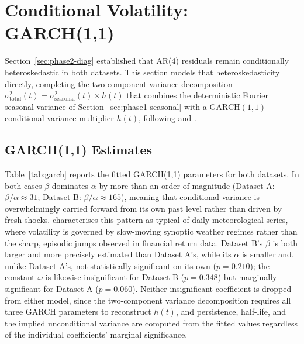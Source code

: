 \section{Conditional Volatility: GARCH(1,1)}
\label{sec:phase3}

Section~\ref{sec:phase2-diag} established that AR(4) residuals remain conditionally heteroskedastic in both datasets. This section models that heteroskedasticity directly, completing the two-component variance decomposition $\sigma^2_{\text{total}}(t) = \sigma^2_{\text{seasonal}}(t) \times h(t)$ that combines the deterministic Fourier seasonal variance of Section~\ref{sec:phase1-seasonal} with a GARCH$(1,1)$ conditional-variance multiplier $h(t)$, following \citet{Tol1997} and \citet{Bollerslev1986}.

\subsection{GARCH(1,1) Estimates}
\label{sec:phase3-estimates}

Table~\ref{tab:garch} reports the fitted GARCH(1,1) parameters for both datasets. In both cases $\beta$ dominates $\alpha$ by more than an order of magnitude (Dataset A: $\beta/\alpha \approx 31$; Dataset B: $\beta/\alpha \approx 165$), meaning that conditional variance is overwhelmingly carried forward from its own past level rather than driven by fresh shocks. \citet{Tol1997} characterises this pattern as typical of daily meteorological series, where volatility is governed by slow-moving synoptic weather regimes rather than the sharp, episodic jumps observed in financial return data. Dataset B's $\beta$ is both larger and more precisely estimated than Dataset A's, while its $\alpha$ is smaller and, unlike Dataset A's, not statistically significant on its own ($p = 0.210$); the constant $\omega$ is likewise insignificant for Dataset B ($p = 0.348$) but marginally significant for Dataset A ($p = 0.060$). Neither insignificant coefficient is dropped from either model, since the two-component variance decomposition requires all three GARCH parameters to reconstruct $h(t)$, and persistence, half-life, and the implied unconditional variance are computed from the fitted values regardless of the individual coefficients' marginal significance.

